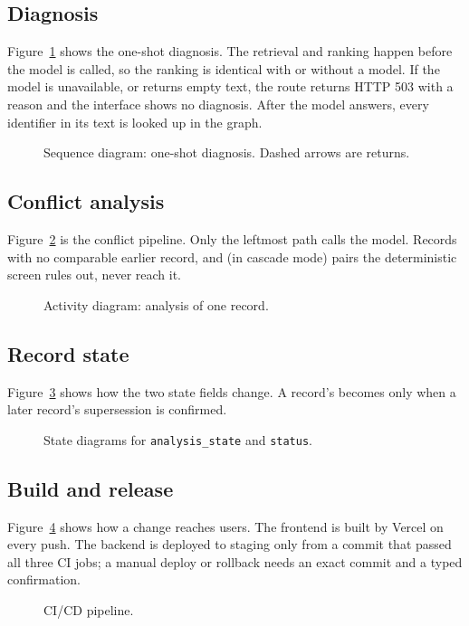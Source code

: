 \subsection{Diagnosis}
Figure~\ref{fig:seq} shows the one-shot diagnosis. The retrieval and ranking happen before the model is called, so the ranking is identical with or without a model. If the model is unavailable, or returns empty text, the route returns HTTP 503 with a reason and the interface shows no diagnosis. After the model answers, every identifier in its text is looked up in the graph.

\begin{figure}[htb]
\centering

\caption{Sequence diagram: one-shot diagnosis. Dashed arrows are returns.}\label{fig:seq}
\end{figure}

\subsection{Conflict analysis}
Figure~\ref{fig:flow} is the conflict pipeline. Only the leftmost path calls the model. Records with no comparable earlier record, and (in cascade mode) pairs the deterministic screen rules out, never reach it.

\begin{figure}[htb]
\centering

\caption{Activity diagram: analysis of one record.}\label{fig:flow}
\end{figure}

\subsection{Record state}
Figure~\ref{fig:states} shows how the two state fields change. A record's  becomes  only when a later record's supersession is confirmed.

\begin{figure}[htb]
\centering

\caption{State diagrams for \texttt{analysis\_state} and \texttt{status}.}\label{fig:states}
\end{figure}

\subsection{Build and release}
Figure~\ref{fig:cicd} shows how a change reaches users. The frontend is built by Vercel on every push. The backend is deployed to staging only from a  commit that passed all three CI jobs; a manual deploy or rollback needs an exact commit and a typed confirmation.

\begin{figure}[htb]
\centering

\caption{CI/CD pipeline.}\label{fig:cicd}
\end{figure}
